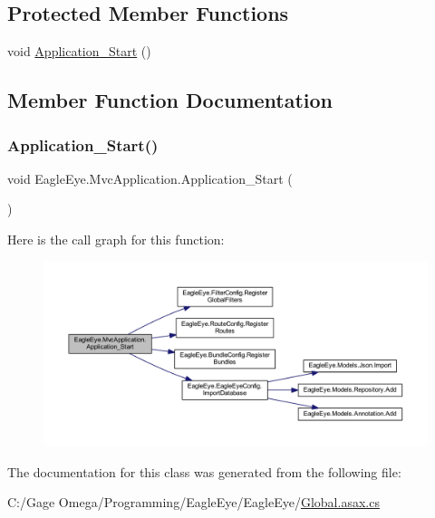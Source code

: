 \subsection*{Protected Member Functions}
\begin{DoxyCompactItemize}
\item 
void \mbox{\hyperlink{class_eagle_eye_1_1_mvc_application_a106011264463f339f3b61880a28238c6}{Application\+\_\+\+Start}} ()
\end{DoxyCompactItemize}


\subsection{Member Function Documentation}
\mbox{\label{class_eagle_eye_1_1_mvc_application_a106011264463f339f3b61880a28238c6}} 
\subsubsection{\texorpdfstring{Application\_Start()}{Application\_Start()}}
{\footnotesize\ttfamily void Eagle\+Eye.\+Mvc\+Application.\+Application\+\_\+\+Start (\begin{DoxyParamCaption}{ }\end{DoxyParamCaption})\hspace{0.3cm}{\ttfamily [protected]}}

Here is the call graph for this function\+:\nopagebreak
\begin{figure}[H]
\begin{center}
\leavevmode
\includegraphics[width=350pt]{class_eagle_eye_1_1_mvc_application_a106011264463f339f3b61880a28238c6_cgraph}
\end{center}
\end{figure}


The documentation for this class was generated from the following file\+:\begin{DoxyCompactItemize}
\item 
C\+:/\+Gage Omega/\+Programming/\+Eagle\+Eye/\+Eagle\+Eye/\mbox{\hyperlink{_global_8asax_8cs}{Global.\+asax.\+cs}}\end{DoxyCompactItemize}
